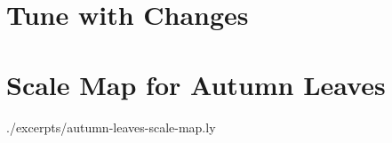 \section{Tune with Changes}


\clearpage
\section{Scale Map for Autumn Leaves} {./excerpts/autumn-leaves-scale-map.ly}
